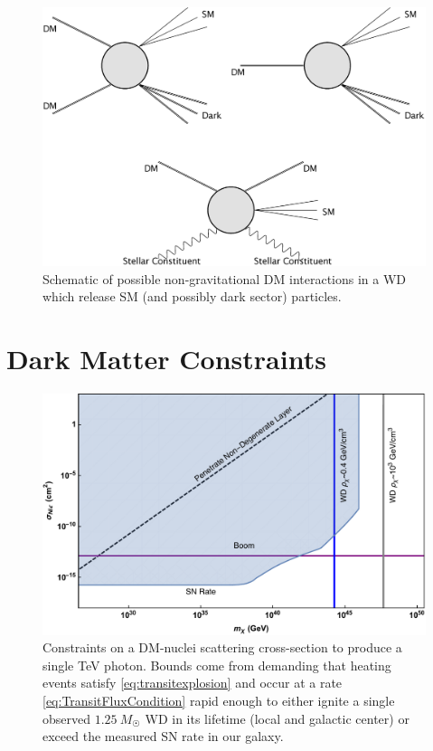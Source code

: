 \documentclass[twocolumn, preprintnumbers,amsmath,amssymb,prd, superscriptaddress]{revtex4}
\begin{document}
\begin{figure}
\includegraphics[scale=0.07]{feynman.png}
\caption{Schematic of possible non-gravitational DM interactions in a WD which release SM (and possibly dark sector) particles.}
\label{fig:feynman}
\end{figure}

\section{Dark Matter Constraints}
\label{sec:Constraints}


\begin{figure}
\includegraphics[scale=.35]{transitobservation.pdf}
\caption{Constraints on a DM-nuclei scattering cross-section to produce a single TeV photon. Bounds come from demanding that heating events satisfy \eqref{eq:transitexplosion} and occur at a rate \eqref{eq:TransitFluxCondition} rapid enough to either ignite a single observed $1.25~M_{\astrosun}$ WD in its lifetime (local and galactic center) or exceed the measured SN rate in our galaxy.}
\label{fig:transitclasses}
\end{figure}
\end{document}
